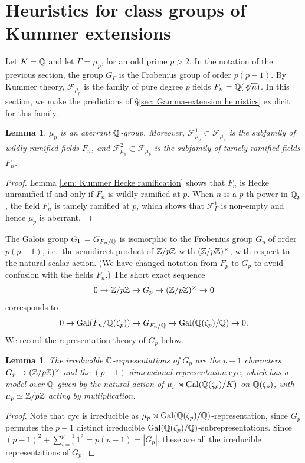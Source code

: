 \documentclass[11pt,a4paper]{amsart}
\def\Z{{\rm \mathbb{Z}}}
\def\Q{{\rm \mathbb{Q}}}
\def\C{{\rm \mathbb{C}}}
\def\Gal{{\rm Gal}}
\numberwithin{equation}{section}
\newtheorem{lemma}[theorem]{Lemma}
\begin{document}
\section{Heuristics for class groups of Kummer extensions}\label{sec: kummer heuristics}
 Let $K = \Q$ and let $\Gamma = \mu_p$, for an odd prime $p > 2$.  In the notation of the previous section, the group $G_\Gamma$ is the Frobenius group of order $p(p-1)$. By Kummer theory,  $\mathcal{F}_{\mu_p}$ is the family of pure degree $p$ fields $F_n = \Q(\sqrt[p]{n})$. In this section, we make the predictions of \S\ref{sec: Gamma-extension heuristics} explicit for this family. 
 
 \begin{lemma}
     $\mu_p$ is an aberrant $\Q$-group. Moreover, $\mathcal{F}_{\mu_p}^1 \subset\mathcal{F}_{\mu_p}$ is the subfamily of wildly ramified fields $F_n$, and $\mathcal{F}_{\mu_p}^2 \subset\mathcal{F}_{\mu_p}$ is the subfamily of tamely ramified fields $F_n$.  
 \end{lemma}
 \begin{proof}
     Lemma \ref{lem: Kummer Hecke ramification} shows that $F_n$ is Hecke unramified if and only if $F_n$ is wildly ramified at $p$. When $n$ is a $p$-th power in $\Q_p$, the field $F_n$ is tamely ramified at $p$, which shows that $\mathcal{F}_\Gamma^{1}$ is non-empty and hence $\mu_p$ is aberrant. 
 \end{proof}


The Galois group $G_\Gamma = G_{F_n/\Q}$ is isomorphic to the Frobenius group $G_p$ of order $p(p-1)$, i.e.\ the  semidirect product of $\Z/p\Z$ with $(\Z/p\Z)^\times$, with respect to the natural scalar action. (We have changed notation from $F_p$ to $G_p$ to avoid confusion with the fields $F_n$.) The short exact sequence
\[0 \to \Z/p\Z \to G_p \to (\Z/p\Z)^\times \to 0\]
corresponds to 
\[0 \to \Gal(\tilde F_n/\Q(\zeta_p)) \to G_{F_n/\Q} \to \Gal(\Q(\zeta_p)/\Q) \to 0.\]
We record the representation theory of $G_p$ below. 
\begin{lemma}\label{lem: rep theory of G_p}
    The irreducible $\C$-representations of $G_p$ are the $p-1$ characters $G_p \to (\Z/p\Z)^\times$ and the $(p-1)$-dimensional representation $\mathrm{cyc}$, which has a model over $\Q$ given by the natural action of $\mu_p \rtimes \Gal(\Q(\zeta_p)/K)$ on $\Q(\zeta_p)$, with $\mu_p \simeq \Z/p\Z$ acting by multiplication.  
\end{lemma}

\begin{proof}
Note that $\mathrm{cyc}$ is irreducible as  $\mu_p \rtimes \Gal(\Q(\zeta_p)/\Q)$-representation, since $G_p$ permutes the $p-1$ distinct irreducible $\Gal(\Q(\zeta_p)/\Q)$-subrepresentations. Since $(p-1)^2 + \sum_{i = 1}^{p-1} 1^2 = p(p-1) = |G_p|$, these are all the irreducible representations of $G_p$. 
\end{proof}
\end{document}

